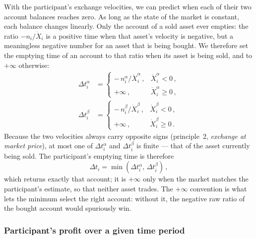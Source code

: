\documentclass[letterpaper]{article}
\begin{document}
With the participant's exchange velocities, we can predict when each of their two account balances reaches zero. As long as the state of the market is constant, each balance changes linearly. Only the account of a sold asset ever empties: the ratio $-n_i/\dot{X}_i$ is a positive time when that asset's velocity is negative, but a meaningless negative number for an asset that is being bought. We therefore set the emptying time of an account to that ratio when its asset is being sold, and to $+\infty$ otherwise:
\begin{align}
    \Delta t_i^\alpha &= \begin{cases} -\, n_i^\alpha / \dot{X}_i^\alpha \,, & \dot{X}_i^\alpha < 0 \,,\\ +\infty \,, & \dot{X}_i^\alpha \geq 0 \,, \end{cases} \nonumber\\
    \Delta t_i^\beta &= \begin{cases} -\, n_i^\beta / \dot{X}_i^\beta \,, & \dot{X}_i^\beta < 0 \,,\\ +\infty \,, & \dot{X}_i^\beta \geq 0 \,. \end{cases} \label{eqDeltaT}
\end{align}
Because the two velocities always carry opposite signs (principle~2, \emph{exchange at market price}), at most one of $\Delta t_i^\alpha$ and $\Delta t_i^\beta$ is finite --- that of the asset currently being sold. The participant's emptying time is therefore
\begin{equation}
    \Delta t_i = \min\!\left(\Delta t_i^\alpha,\, \Delta t_i^\beta\right) \,,
\end{equation}
which returns exactly that account; it is $+\infty$ only when the market matches the participant's estimate, so that neither asset trades. The $+\infty$ convention is what lets the minimum select the right account: without it, the negative raw ratio of the bought account would spuriously win.

\subsubsection{Participant's profit over a given time period}\label{secParticipantProfit}
\end{document}
